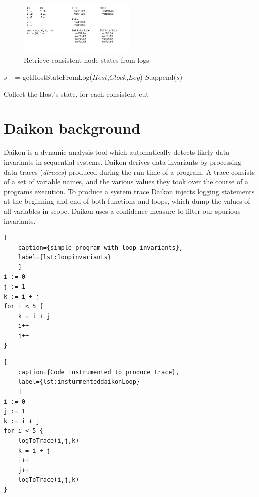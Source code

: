 \begin{figure}[h]
    \includegraphics[width=0.5\textwidth]{fig/merge-point-logs}
  \caption{Retrieve consistent node states from logs}
\end{figure}

\begin{algorithm}
  {
      {
         $s$ += getHostStateFromLog($Host$,$Clock$,$Log$)
     }
     $S$.append($s$)
 }

 \caption{Collect the Host's state, for each consistent cut}
 \label{alg:collectStates}
\end{algorithm}



\section{Daikon background}
\label{daikon-appendix}

Daikon is a dynamic analysis tool which automatically detects likely
data invariants in sequential systems. Daikon derives data invariants
by processing data traces (\emph{dtraces}) produced during the run
time of a program. A trace consists of a set of variable names, and
the various values they took over the course of a programs
execution. To produce a system trace Daikon injects logging statements
at the beginning and end of both functions and loops, which dump the
values of all variables in scope. Daikon uses a confidence measure to
filter our spurious invariants.

\begin{lstlisting}[
    caption={simple program with loop invariants},
    label={lst:loopinvariants}
    ]
i := 0
j := 1
k := i + j
for i < 5 {
    k = i + j
    i++
    j++
}
\end{lstlisting}

\begin{lstlisting}[
    caption={Code instrumented to produce trace},
    label={lst:insturmenteddaikonLoop}
    ]
i := 0
j := 1
k := i + j
for i < 5 {
    logToTrace(i,j,k)
    k = i + j
    i++
    j++
    logToTrace(i,j,k)
}
\end{lstlisting}

